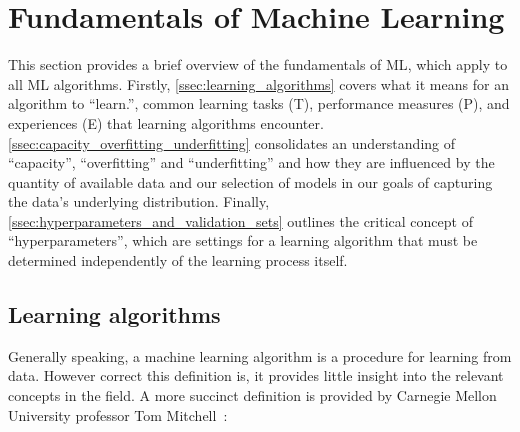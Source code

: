 \section{Fundamentals of Machine Learning}\label{sec:fundamentals_of_machine_learning}



This section provides a brief overview of the fundamentals of \gls{ML}, which apply to all \gls{ML} algorithms. Firstly, \autoref{ssec:learning_algorithms} covers what it means for an algorithm to ``learn.'', common learning tasks (T), performance measures (P), and experiences (E) that learning algorithms encounter. \autoref{ssec:capacity_overfitting_underfitting} consolidates an understanding of ``capacity'', ``overfitting'' and ``underfitting'' and how they are influenced by the quantity of available data and our selection of models in our goals of capturing the data's underlying distribution. Finally, \autoref{ssec:hyperparameters_and_validation_sets} outlines the critical concept of ``hyperparameters'', which are settings for a learning algorithm that must be determined independently of the learning process itself.

\subsection{Learning algorithms}\label{ssec:learning_algorithms}
Generally speaking, a machine learning algorithm is a procedure for learning from data. However correct this definition is, it provides little insight into the relevant concepts in the field. A more succinct definition is provided by Carnegie Mellon University professor Tom Mitchell~\cite{Mitchell97LearningAlgorithm}:

